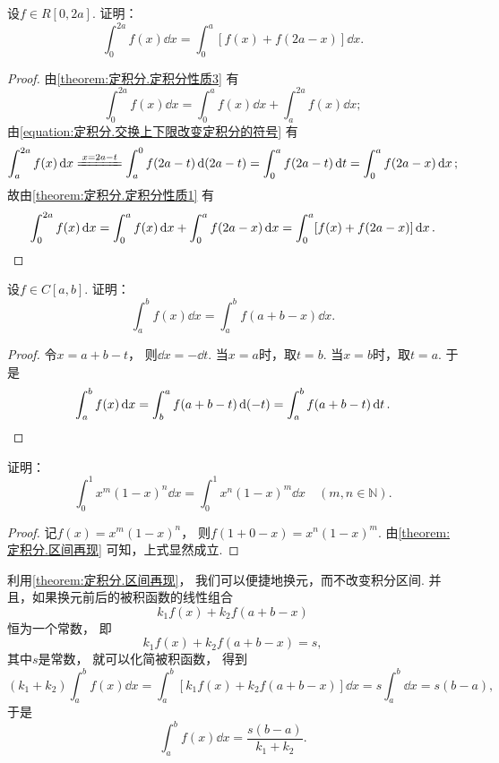 \begin{example}
设\(f \in R[0,2a]\).
证明：\begin{equation}\label{equation:定积分.区间折半}
	\int_0^{2a} f(x) \dd{x} = \int_0^a [f(x) + f(2a-x)] \dd{x}.
\end{equation}
\begin{proof}
由\cref{theorem:定积分.定积分性质3} 有\[
	\int_0^{2a} f(x) \dd{x}
	= \int_0^a f(x) \dd{x} + \int_a^{2a} f(x) \dd{x};
\]
由\cref{equation:定积分.交换上下限改变定积分的符号} 有\[
	\int_a^{2a} f(x) \dd{x}
	\xlongequal{x=2a-t} \int_a^0 f(2a-t) \dd(2a-t)
	= \int_0^a f(2a-t) \dd{t}
	= \int_0^a f(2a-x) \dd{x};
\]
故由\cref{theorem:定积分.定积分性质1} 有\[
	\int_0^{2a} f(x) \dd{x}
	= \int_0^a f(x) \dd{x} + \int_0^a f(2a-x) \dd{x}
	= \int_0^a [f(x) + f(2a-x)] \dd{x}.
	\qedhere
\]
\end{proof}
\end{example}

\begin{proposition}\label{theorem:定积分.区间再现}
设\(f \in C[a,b]\).
证明：\begin{equation}
	\int_a^b f(x) \dd{x}
	= \int_a^b f(a+b-x) \dd{x}.
\end{equation}
\begin{proof}
令\(x=a+b-t\)，
则\(\dd{x} = -\dd{t}\).
当\(x=a\)时，取\(t=b\).
当\(x=b\)时，取\(t=a\).
于是\[
	\int_a^b f(x) \dd{x}
	= \int_b^a f(a+b-t) \dd(-t)
	= \int_a^b f(a+b-t) \dd{t}.
	\qedhere
\]
\end{proof}
\end{proposition}

\begin{example}
证明：\begin{equation}
	\int_0^1 x^m (1-x)^n \dd{x}
	= \int_0^1 x^n (1-x)^m \dd{x}
	\quad(m,n\in\mathbb{N}).
\end{equation}
\begin{proof}
记\(f(x) = x^m (1-x)^n\)，
则\(f(1+0-x) = x^n (1-x)^m\).
由\cref{theorem:定积分.区间再现} 可知，上式显然成立.
\end{proof}
\end{example}

\begin{remark}
利用\cref{theorem:定积分.区间再现}，
我们可以便捷地换元，而不改变积分区间.
并且，如果换元前后的被积函数的线性组合\[
	k_1 f(x) + k_2 f(a+b-x)
\]恒为一个常数，
即\[
	k_1 f(x) + k_2 f(a+b-x) = s,
\]
其中\(s\)是常数，
就可以化简被积函数，
得到\[
	(k_1 + k_2) \int_a^b f(x) \dd{x}
	= \int_a^b [k_1 f(x) + k_2 f(a+b-x)] \dd{x}
	= s \int_a^b \dd{x} = s(b-a),
\]
于是\[
	\int_a^b f(x) \dd{x}
	= \frac{s(b-a)}{k_1 + k_2}.
\]
\end{remark}

